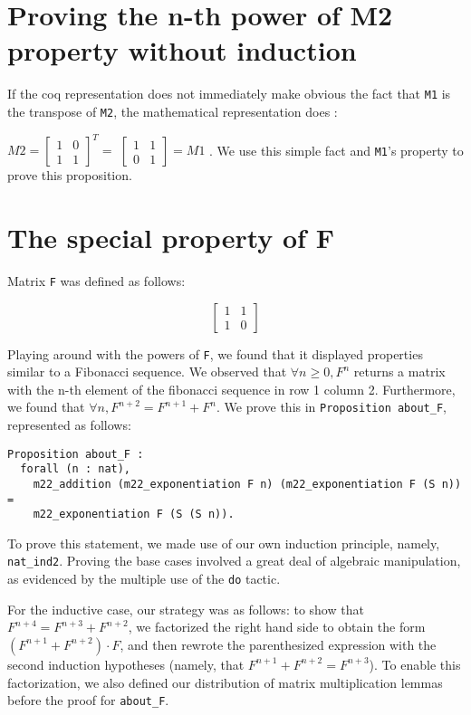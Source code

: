 \documentclass[12pt, a4paper]{article}
\begin{document}
\section{Proving the n-th power of M2 property without induction}

If the coq representation does not immediately make obvious the fact that \verb-M1- 
is the transpose of \verb-M2-, the mathematical representation does : 

$
M2 = \begin{bmatrix}
  1 & 0 \\
  1 & 1
\end{bmatrix}^T = 
$ 
$
\begin{bmatrix}
  1 & 1 \\
  0 & 1
\end{bmatrix} = M1
$
. We use this simple fact and \verb-M1-'s property to prove this proposition. 

\section{ The special property of F}

Matrix \verb-F- was defined as follows: 

$$ 
\begin{bmatrix}
  1 & 1 \\
  1 & 0
\end{bmatrix}
$$

Playing around with the powers of \verb-F-, we found that it displayed properties
similar to a Fibonacci sequence. We observed that $ \forall n \geq 0, F^n$ returns a 
matrix with the n-th element of the fibonacci sequence in row 1 column 2. 
Furthermore, we found that $\forall n, F^ {n+2} = F^{n+1} + F^n$. We prove 
this in \verb-Proposition about_F-, represented as follows: 

\begin{lstlisting}
Proposition about_F :
  forall (n : nat),
    m22_addition (m22_exponentiation F n) (m22_exponentiation F (S n)) =
    m22_exponentiation F (S (S n)).
\end{lstlisting}

To prove this statement, we made use of our own induction principle, namely,  
\verb-nat_ind2-. Proving the base cases involved a great deal of algebraic 
manipulation, as evidenced by the multiple use of the \verb-do- tactic. 

For the inductive case, our strategy was as follows: to show that 
$F^{n+4} = F^{n+3} + F^{n+2}$, we factorized the right hand side to obtain the
form $(F^{n+1} + F^{n+2}) 
\cdot F$, and then rewrote the parenthesized expression with the
second induction hypotheses (namely, that $F^{n+1} + F^{n+2} = F^{n+3}$). To enable
this factorization, we also defined our distribution of matrix multiplication
lemmas before the proof for \verb-about_F-.
\end{document}
